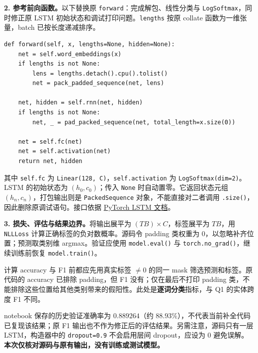 \textbf{2. 参考前向函数。}以下替换原 \texttt{forward}：完成解包、线性分类与 \texttt{LogSoftmax}，同时修正原 LSTM 初始状态和调试打印问题。\texttt{lengths} 按原 collate 函数为一维张量，batch 已按长度递减排序。
\par
\begingroup\linespread{1}\fontsize{9}{11}\selectfont
\begin{verbatim}
def forward(self, x, lengths=None, hidden=None):
    net = self.word_embeddings(x)
    if lengths is not None:
        lens = lengths.detach().cpu().tolist()
        net = pack_padded_sequence(net, lens)

    net, hidden = self.rnn(net, hidden)
    if lengths is not None:
        net, _ = pad_packed_sequence(net, total_length=x.size(0))

    net = self.fc(net)
    net = self.activation(net)
    return net, hidden
\end{verbatim}
\endgroup
其中 \texttt{self.fc} 为 \texttt{Linear(128, C)}，\texttt{self.activation} 为 \texttt{LogSoftmax(dim=2)}。LSTM 的初始状态为 $(h_0,c_0)$；传入 \texttt{None} 时自动置零。它返回状态元组 $(h_n,c_n)$，打包输出则是 \texttt{PackedSequence} 对象，不能直接对二者调用 \texttt{.size()}，因此删除原调试语句。接口依据
\href{https://docs.pytorch.org/docs/stable/generated/torch.nn.LSTM.html}{PyTorch LSTM 文档}。

\textbf{3. 损失、评估与结果边界。}将输出展平为 $(TB)\times C$，标签展平为 $TB$，用 \texttt{NLLLoss} 计算正确标签的负对数概率。源码令 padding 类权重为 0，以忽略补齐位置；预测取类别维 argmax。验证应使用 \texttt{model.eval()} 与 \texttt{torch.no\_grad()}，继续训练前恢复 \texttt{model.train()}。

计算 accuracy 与 F1 前都应先用真实标签 $\ne0$ 的同一 mask 筛选预测和标签。原代码的 accuracy 已排除 padding，但 F1 没有；仅在最后不打印 padding 类，不能排除这些位置给其他类别带来的假阳性。此处是\textbf{逐词分类}指标，与 Q1 的实体跨度 F1 不同。

notebook 保存的历史验证准确率为 $0.889264$（约 $88.93\%$），不代表当前补全代码已复现该结果；原 F1 输出也不作为修正后的评估结果。另需注意，源码只有一层 LSTM，构造器中的 \texttt{dropout=0.9} 不会启用层间 dropout，应设为 0 避免误解。\textbf{本次仅核对源码与原有输出，没有训练或测试模型。}

\endgroup
